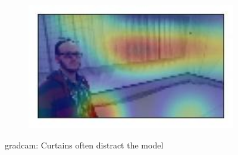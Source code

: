 \begin{figure}[!h]
\begin{center}
\begin{subfigure}[h]{0.24\textwidth}
		\end{subfigure}
		\hfill
		\begin{subfigure}[h]{0.24\textwidth}
			\centering
			\includegraphics[width=1\textwidth]{"contents/images/gradcam/gradcam-curtains-4"}
		\end{subfigure}
	\end{center}
	\vspace{-0.5cm}
	\caption[\gls{gradcam}: Curtains often distract the model]{\gls{gradcam}: Curtains often distract the model}
	\label{fig:gradcam-curtains}
\end{figure}

